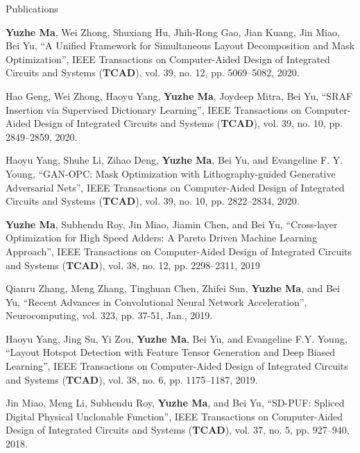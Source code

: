 \begin{rSection}{Publications}
\begin{etaremune}
\item{
        \textbf{Yuzhe Ma}, Wei Zhong, Shuxiang Hu, Jhih-Rong Gao, Jian Kuang, Jin Miao, Bei Yu,
        ``A Unified Framework for Simultaneous Layout Decomposition and Mask Optimization'',
        IEEE Transactions on Computer-Aided Design of Integrated Circuits and Systems (\textbf{TCAD}), vol. 39, no. 12, pp. 5069--5082, 2020.
}

\item{
     Hao Geng, Wei Zhong, Haoyu Yang, \textbf{Yuzhe Ma}, Joydeep Mitra, Bei Yu,
        ``SRAF Insertion via Supervised Dictionary Learning'',
        IEEE Transactions on Computer-Aided Design of Integrated Circuits and Systems (\textbf{TCAD}), vol. 39, no. 10, pp. 2849--2859, 2020.
}

\item{
    Haoyu Yang, Shuhe Li, Zihao Deng, \textbf{Yuzhe Ma}, Bei Yu, and Evangeline F. Y. Young,
    ``GAN-OPC: Mask Optimization with Lithography-guided Generative Adversarial Nets'',
     IEEE Transactions on Computer-Aided Design of Integrated Circuits and Systems (\textbf{TCAD}), vol. 39, no. 10, pp. 2822--2834, 2020.
}

\item{
	\textbf{Yuzhe Ma}, Subhendu Roy, Jin Miao, Jiamin Chen, and Bei Yu,
	``Cross-layer Optimization for High Speed Adders: A Pareto Driven Machine Learning Approach'',
    IEEE Transactions on Computer-Aided Design of Integrated Circuits and Systems (\textbf{TCAD}), vol. 38, no. 12, pp. 2298--2311, 2019
}

\item{
	Qianru Zhang, Meng Zhang, Tinghuan Chen, Zhifei Sun, \textbf{Yuzhe Ma}, and Bei Yu,
	``Recent Advances in Convolutional Neural Network Acceleration'',
	Neurocomputing, vol. 323, pp. 37-51, Jan., 2019.
}

\item{
	Haoyu Yang, Jing Su, Yi Zou, \textbf{Yuzhe Ma}, Bei Yu, and Evangeline F.Y. Young,
	``Layout Hotspot Detection with Feature Tensor Generation and Deep Biased Learning'',
	IEEE Transactions on Computer-Aided Design of Integrated Circuits and Systems (\textbf{TCAD}), vol. 38, no. 6, pp. 1175--1187, 2019.
}

\item{
	Jin Miao, Meng Li, Subhendu Roy, \textbf{Yuzhe Ma}, and Bei Yu,
	``SD-PUF: Spliced Digital Physical Unclonable Function'',
	IEEE Transactions on Computer-Aided Design of Integrated Circuits and Systems (\textbf{TCAD}), vol. 37, no. 5, pp. 927--940, 2018.
}
\end{etaremune}



\end{rSection}
